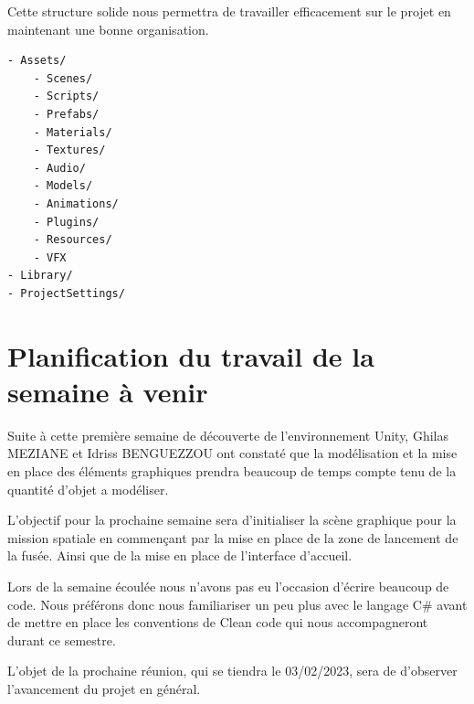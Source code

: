 \documentclass[a4paper, 12pt]{article}
\begin{document}
Cette structure solide nous permettra de travailler efficacement sur le projet en maintenant une bonne organisation.
\\
\begin{lstlisting}[language=Bash]
- Assets/
    - Scenes/
    - Scripts/
    - Prefabs/
    - Materials/
    - Textures/
    - Audio/
    - Models/
    - Animations/
    - Plugins/
    - Resources/
    - VFX
- Library/
- ProjectSettings/
\end{lstlisting}

\section{Planification du travail de la semaine à venir}

Suite à cette première semaine de découverte de l'environnement Unity, Ghilas MEZIANE et Idriss BENGUEZZOU ont constaté que la modélisation et la mise en place des éléments graphiques prendra beaucoup de temps compte tenu de la quantité d'objet a modéliser. 

L'objectif pour la prochaine semaine sera d'initialiser la scène graphique pour la mission spatiale en commençant par la mise en place de la zone de lancement de la fusée. Ainsi que de la mise en place de l'interface d'accueil.

Lors de la semaine écoulée nous n'avons pas eu l'occasion d'écrire beaucoup de code. Nous préférons donc nous familiariser un peu plus avec le langage C\# avant de mettre en place les conventions de Clean code qui nous accompagneront durant ce semestre.

L'objet de la prochaine réunion, qui se tiendra le 03/02/2023, sera de d'observer l'avancement du projet en général.
\end{document}
